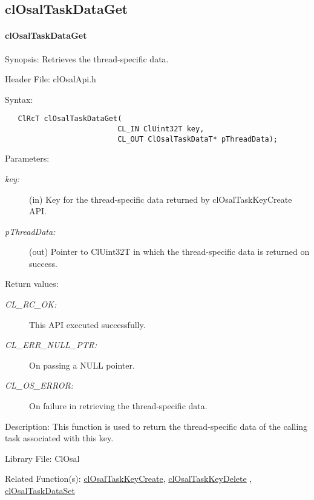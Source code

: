 \newpage
\subsection{clOsalTaskDataGet}
\hypertarget{pageosal126}{}\paragraph{cl\-Osal\-Task\-Data\-Get}\label{pageosal126}
\begin{Desc}
\item[Synopsis:]Retrieves the thread-specific data.\end{Desc}
\begin{Desc}
\item[Header File:]clOsalApi.h\end{Desc}
\begin{Desc}
\item[Syntax:]

\footnotesize\begin{verbatim}   ClRcT clOsalTaskDataGet(
                          CL_IN ClUint32T key,
                          CL_OUT ClOsalTaskDataT* pThreadData);
\end{verbatim}
\normalsize
\end{Desc}
\begin{Desc}
\item[Parameters:]
\begin{description}
\item[{\em key:}](in) Key for the thread-specific data returned by cl\-Osal\-Task\-Key\-Create API. \item[{\em p\-Thread\-Data:}](out) Pointer to Cl\-Uint32T in which the thread-specific data is returned on success.\end{description}
\end{Desc}
\begin{Desc}
\item[Return values:]
\begin{description}
\item[{\em CL\_\-RC\_\-OK:}]This API executed successfully. \item[{\em CL\_\-ERR\_\-NULL\_\-PTR:}]On passing a NULL pointer. \item[{\em CL\_\-OS\_\-ERROR:}]On failure in retrieving the thread-specific data.\end{description}
\end{Desc}
\begin{Desc}
\item[Description:]This function is used to return the thread-specific data of the calling task associated with this key.\end{Desc}
\begin{Desc}
\item[Library File:]Cl\-Osal\end{Desc}
\begin{Desc}
\item[Related Function(s):]\hyperlink{pageosal123}{cl\-Osal\-Task\-Key\-Create}, \hyperlink{pageosal124}{cl\-Osal\-Task\-Key\-Delete} , 
\hyperlink{pageosal125}{cl\-Osal\-Task\-Data\-Set} \end{Desc}

